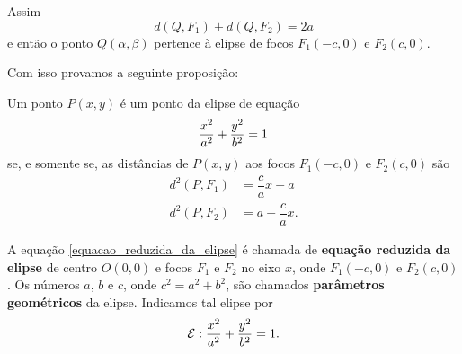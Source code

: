 Assim
\[
    d(Q,F_1) + d(Q,F_2) = 2a
\]
e então o ponto $Q(\alpha,\beta)$ pertence à elipse de focos $F_1(-c,0)$ e $F_2(c,0)$.

Com isso provamos a seguinte proposição:
\begin{proposicao}
    Um ponto $P(x,y)$ é um ponto da elipse de equação
    \begin{align}\label{equacao_reduzida_da_elipse}
        \dfrac{x^2}{a^2} + \dfrac{y^2}{b^2} = 1
    \end{align}
    se, e somente se, as distâncias de $P(x, y)$ aos focos $F_1(-c, 0)$ e $F_2(c, 0)$ são
    \begin{align*}
        d^2(P,F_1) & = \dfrac{c}{a}x+ a   \\
        d^2(P,F_2) & = a - \dfrac{c}{a}x.
    \end{align*}
\end{proposicao}

\begin{definicao}
    A equação \eqref{equacao_reduzida_da_elipse} é chamada de \textbf{equação reduzida da elipse} de centro $O(0,0)$ e focos $F_1$ e $F_2$ no eixo $x$, onde
    $F_1(-c, 0)$ e $F_2(c, 0)$. Os números $a$, $b$ e $c$, onde $c^2 = a^2 + b^2$, são chamados \textbf{parâmetros geométricos} da elipse. Indicamos tal
    elipse por
    \[
        \mathcal{E}: \dfrac{x^2}{a^2} + \dfrac{y^2}{b^2} = 1.
    \]
\end{definicao}

\newpage

